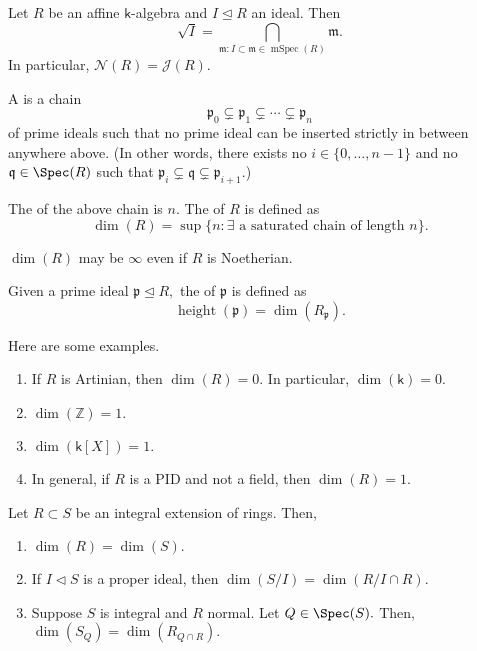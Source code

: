 \documentclass[12pt]{article}	%
\DeclareMathOperator{\mSpec}{mSpec}
\DeclareMathOperator{\htt}{height}
\begin{document}
\begin{cor}
	Let $R$ be an affine $\mathsf{k}$-algebra and $I \unlhd R$ an ideal. Then
	\begin{equation*} 
		\sqrt{I} = \bigcap_{\mathfrak{m} : I \subset \mathfrak{m} \in \mSpec(R)} \mathfrak{m}.
	\end{equation*}
	In particular, $\mathcal{N}(R) = \mathcal{J}(R).$
\end{cor}

\begin{defn}%
	\label{defn:krulldimring}
	A  is a chain
	\begin{equation*} 
		\mathfrak{p}_0 \subsetneq \mathfrak{p}_1 \subsetneq \cdots \subsetneq \mathfrak{p}_n
	\end{equation*}
	of prime ideals such that no prime ideal can be inserted strictly in between anywhere above. (In other words, there exists no $i \in \{0, \ldots, n - 1\}$ and no $\mathfrak{q} \in \Spec(R)$ such that $\mathfrak{p}_i \subsetneq \mathfrak{q} \subsetneq \mathfrak{p}_{i + 1}.$)

	The  of the above chain is $n.$ The  of $R$ is defined as
	\begin{equation*} 
		\dim(R) = \sup\{n : \exists \text{ a saturated chain of length }n\}.
	\end{equation*}
\end{defn}
$\dim(R)$ may be $\infty$ even if $R$ is Noetherian. 
\begin{defn}%
	Given a prime ideal $\mathfrak{p} \unlhd R,$ the  of $\mathfrak{p}$ is defined as 
	\begin{equation*} 
		\htt(\mathfrak{p}) = \dim(R_\mathfrak{p}).
	\end{equation*}
\end{defn}

\begin{ex}
	Here are some examples.
	\begin{enumerate}
		\item If $R$ is Artinian, then $\dim(R) = 0.$ In particular, $\dim(\mathsf{k}) = 0.$
		\item $\dim(\mathbb{Z}) = 1.$
		\item $\dim(\mathsf{k}[X]) = 1.$
		\item In general, if $R$ is a PID and not a field, then $\dim(R) = 1.$
	\end{enumerate}
\end{ex}

\begin{prop}
	Let $R \subset S$ be an integral extension of rings. Then,
	\begin{enumerate}
		\item $\dim(R) = \dim(S).$
		\item If $I \lhd S$ is a proper ideal, then $\dim(S/I) = \dim(R/I \cap R).$
		\item Suppose $S$ is integral and $R$ normal. Let $Q \in \Spec(S).$ Then, $\dim(S_Q) = \dim(R_{Q \cap R}).$
	\end{enumerate}
\end{prop}
\end{document}
